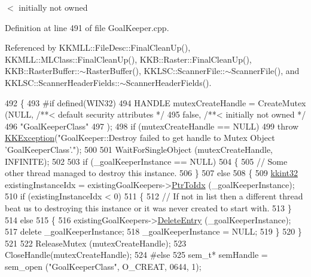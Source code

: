 $<$ initially not owned 

Definition at line 491 of file Goal\+Keeper.\+cpp.



Referenced by K\+K\+M\+L\+L\+::\+File\+Desc\+::\+Final\+Clean\+Up(), K\+K\+M\+L\+L\+::\+M\+L\+Class\+::\+Final\+Clean\+Up(), K\+K\+B\+::\+Raster\+::\+Final\+Clean\+Up(), K\+K\+B\+::\+Raster\+Buffer\+::$\sim$\+Raster\+Buffer(), K\+K\+L\+S\+C\+::\+Scanner\+File\+::$\sim$\+Scanner\+File(), and K\+K\+L\+S\+C\+::\+Scanner\+Header\+Fields\+::$\sim$\+Scanner\+Header\+Fields().


\begin{DoxyCode}
492 \{
493 \textcolor{preprocessor}{#if  defined(WIN32)}
494   HANDLE  mutexCreateHandle = CreateMutex (NULL,                 \textcolor{comment}{/**< default security attributes */}
495                                            \textcolor{keyword}{false},                \textcolor{comment}{/**< initially not owned */}
496                                            \textcolor{stringliteral}{"GoalKeeperClass"}
497                                           ); 
498   \textcolor{keywordflow}{if} (mutexCreateHandle == NULL)
499     \textcolor{keywordflow}{throw} \hyperlink{class_k_k_b_1_1_k_k_exception}{KKException}(\textcolor{stringliteral}{"GoalKeeper::Destroy  failed to get handle to Mutex Object
       'GoalKeeperClass'."});
500 
501   WaitForSingleObject (mutexCreateHandle, INFINITE);
502 
503   \textcolor{keywordflow}{if}  (\_goalKeeperInstance == NULL)
504   \{
505     \textcolor{comment}{// Some other thread managed to destroy this instance.}
506   \}
507   \textcolor{keywordflow}{else}
508   \{
509     \hyperlink{namespace_k_k_b_a8fa4952cc84fda1de4bec1fbdd8d5b1b}{kkint32}  existingInstanceIdx =  existingGoalKeepers->\hyperlink{class_k_k_b_1_1_k_k_queue_ac7c26abdf599669a4b0898534f735f99}{PtrToIdx} (\_goalKeeperInstance);
510     \textcolor{keywordflow}{if}  (existingInstanceIdx < 0)
511     \{
512       \textcolor{comment}{// If not in list then a  different thread beat us to destroying this instance or it was never
       created to start with.}
513     \}
514     \textcolor{keywordflow}{else}
515     \{
516       existingGoalKeepers->\hyperlink{class_k_k_b_1_1_k_k_queue_ae362e3b0a128e8a09182e167befda088}{DeleteEntry} (\_goalKeeperInstance);
517       \textcolor{keyword}{delete}  \_goalKeeperInstance;
518       \_goalKeeperInstance = NULL;
519     \}
520   \}
521 
522   ReleaseMutex (mutexCreateHandle);
523   CloseHandle(mutexCreateHandle);
524 \textcolor{preprocessor}{#else}
525   sem\_t*  semHandle = sem\_open (\textcolor{stringliteral}{"GoalKeeperClass"}, O\_CREAT, 0644, 1);

\end{DoxyCode}
